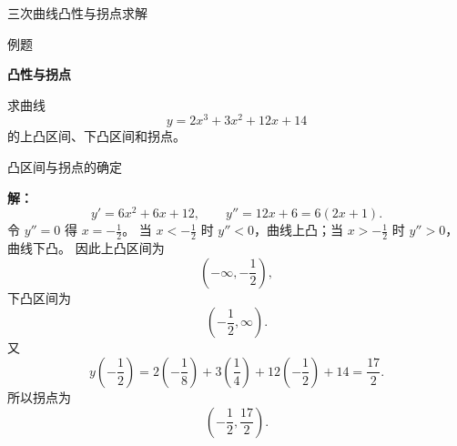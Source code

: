 \documentclass[aspectratio=169,10pt,fontset=fandol]{ctexbeamer}
\begin{document}
\begin{frame}[t,fragile]{三次曲线凸性与拐点求解}
\footnotesize
\begin{block}{例题}
{\footnotesize
\textbf{凸性与拐点}\par

求曲线
\[
y=2x^3+3x^2+12x+14
\]
的上凸区间、下凸区间和拐点。

}
\end{block}
\end{frame}
\begin{frame}[t,fragile]{凸区间与拐点的确定}
\footnotesize
{\footnotesize
\textbf{解：}
\[
y'=6x^2+6x+12,\qquad y''=12x+6=6(2x+1).
\]
令 $y''=0$ 得 $x=-\frac12$。 当 $x<-\frac12$ 时 $y''<0$，曲线上凸；当 $x>-\frac12$ 时 $y''>0$，曲线下凸。 因此上凸区间为
\[
\left(-\infty,-\frac12\right),
\]
下凸区间为
\[
\left(-\frac12,\infty\right).
\]
又
\[
y\left(-\frac12\right)=2\left(-\frac18\right)+3\left(\frac14\right)+12\left(-\frac12\right)+14
=\frac{17}{2}.
\]
所以拐点为
\[
\left(-\frac12,\frac{17}{2}\right).
\]

}
\end{frame}
\end{document}
